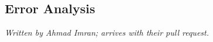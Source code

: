 \subsection{Error Analysis}
\label{sec:errors}

\emph{Written by Ahmad Imran; arrives with their pull request.}
